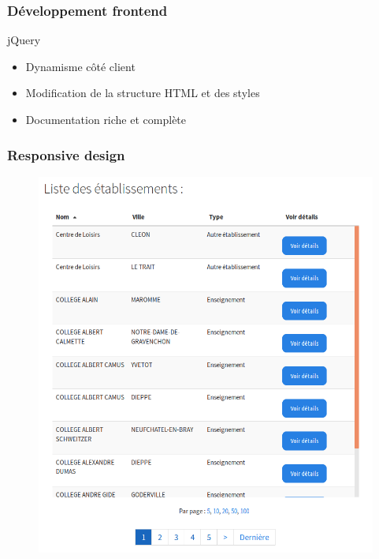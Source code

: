 \begin{frame}
\frametitle{Développement frontend}
\begin{block}{jQuery }
	\begin{itemize}
		\item Dynamisme côté client
		\item Modification de la structure HTML et des styles
		\item Documentation riche et complète
	\end{itemize}
\end{block}
\end{frame}

\begin{frame}
\frametitle{Responsive design}
	\begin{multicols}{2}
		\begin{figure}[!h]
			\begin{center}
				\includegraphics[scale=0.19]{images/screenshot1.png}


\end{center}
\end{figure}
\end{multicols}
\end{frame}
